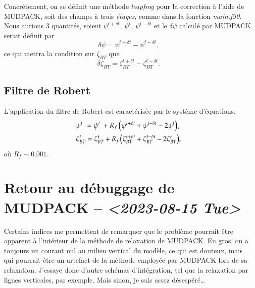 \documentclass[10pt]{article}
\numberwithin{equation}{section}
\newcommand{\pt}{\hspace{1pt}}
\begin{document}
Concrétement, on se définit une méthode \emph{leapfrog} pour la correction à l'aide de MUDPACK, soit des champs à trois \emph{étages}, comme dans la fonction \emph{main.f90}.
Nous aurions 3 quantités, soient \(\psi^{t+\delta t}\), \(\psi^t\), \(\psi^{t-\delta t}\) et le \(\delta \psi\) calculé par MUDPACK serait définit par
\begin{equation}
\label{eq:orgfe08445}
   \delta \psi = \psi^{t+\delta t} - \psi^{t-\delta t},
\end{equation}
ce qui mettra la condition sur \(\zeta_{BT}\) que
\begin{equation}
\label{eq:org305b786}
   \delta \zeta_{BT} = \zeta_{BT}^{t+\delta t} - \zeta_{BT}^{t-\delta t}.
\end{equation}

\subsection{Filtre de Robert}
\label{sec:org0dde827}
\label{orgb2d5eb0}
L'application du filtre de Robert est caractérisée par le système d'équations,
\begin{align}
   &\psi^t \ \pt= \psi^t \ + R_f\pt\pt \qty( \psi^{t+\delta t}  +\psi^{t-\delta t} - 2\psi^t)\pt,\\
   &\zeta_{BT}^t = \zeta_{BT}^t + R_f\pt \qty( \zeta_{BT}^{t+\delta t}  +\zeta_{BT}^{t-\delta t} - 2\zeta_{BT}^t),
\end{align}
où \(R_f \sim 0.001\).



\section{Retour au débuggage de MUDPACK -- \textit{<2023-08-15 Tue>}}
\label{sec:orgde4b868}
Certains indices me permettent de remarquer que le problème pourrait être apparent à l'intérieur de la méthode de relaxation de MUDPACK.
En gros, on a toujours un courant nul au milieu vertical du modèle, ce qui est douteux, mais qui pourrait être un artefact de la méthode employée par MUDPACK lors de sa relaxation.
J'essaye donc d'autre schémas d'intégration, tel que la relaxation par lignes verticales, par exemple.
Mais sinon, je suis assez désespéré\ldots{}
\end{document}
